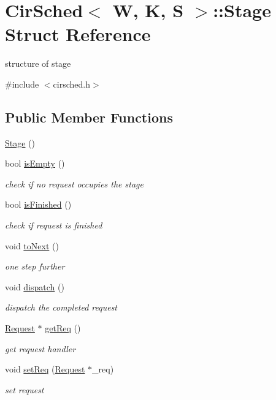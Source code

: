 \hypertarget{structCirSched_1_1Stage}{\section{Cir\-Sched$<$ W, K, S $>$\-:\-:Stage Struct Reference}
\label{structCirSched_1_1Stage}
}


structure of stage  




{\ttfamily \#include $<$cirsched.\-h$>$}

\subsection*{Public Member Functions}
\begin{DoxyCompactItemize}
\item 
\hyperlink{structCirSched_1_1Stage_afa345d66cb45d79093039f3a5c6ff9df}{Stage} ()
\item 
bool \hyperlink{structCirSched_1_1Stage_a4a1d152024688760a0e7bc3b66b0c8ef}{is\-Empty} ()
\begin{DoxyCompactList}\small\item\em check if no request occupies the stage \end{DoxyCompactList}\item 
bool \hyperlink{structCirSched_1_1Stage_a684b6f40f83bf395d7849950e8ef3715}{is\-Finished} ()
\begin{DoxyCompactList}\small\item\em check if request is finished \end{DoxyCompactList}\item 
void \hyperlink{structCirSched_1_1Stage_a1c90362d80f455ae904d76cd05fc1292}{to\-Next} ()
\begin{DoxyCompactList}\small\item\em one step further \end{DoxyCompactList}\item 
void \hyperlink{structCirSched_1_1Stage_aa3d93a5f7ad03b098052b8481db97824}{dispatch} ()
\begin{DoxyCompactList}\small\item\em dispatch the completed request \end{DoxyCompactList}\item 
\hyperlink{structCirSched_1_1Request}{Request} $\ast$ \hyperlink{structCirSched_1_1Stage_aed1fc3846f092c61e3725ef30aff5363}{get\-Req} ()
\begin{DoxyCompactList}\small\item\em get request handler \end{DoxyCompactList}\item 
void \hyperlink{structCirSched_1_1Stage_a09e329c2b829d4881e63fdbee3a63a9b}{set\-Req} (\hyperlink{structCirSched_1_1Request}{Request} $\ast$\-\_\-req)
\begin{DoxyCompactList}\small\item\em set request \end{DoxyCompactList}\end{DoxyCompactItemize}
